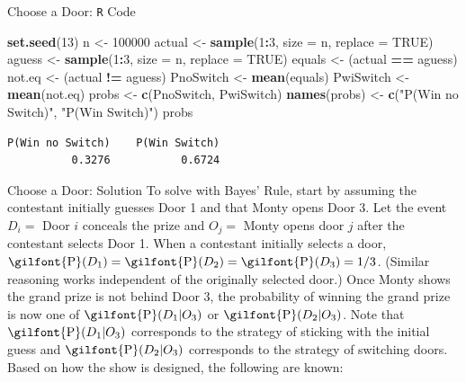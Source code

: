 \documentclass[
  ignorenonframetext,
]{beamer}
\newenvironment{Shaded}{\begin{snugshade}}{\end{snugshade}}
\newcommand{\AttributeTok}[1]{\textcolor[rgb]{0.13,0.29,0.53}{#1}}
\newcommand{\ConstantTok}[1]{\textcolor[rgb]{0.56,0.35,0.01}{#1}}
\newcommand{\DecValTok}[1]{\textcolor[rgb]{0.00,0.00,0.81}{#1}}
\newcommand{\FunctionTok}[1]{\textcolor[rgb]{0.13,0.29,0.53}{\textbf{#1}}}
\newcommand{\NormalTok}[1]{#1}
\newcommand{\OtherTok}[1]{\textcolor[rgb]{0.56,0.35,0.01}{#1}}
\newcommand{\SpecialCharTok}[1]{\textcolor[rgb]{0.81,0.36,0.00}{\textbf{#1}}}
\newcommand{\StringTok}[1]{\textcolor[rgb]{0.31,0.60,0.02}{#1}}
\begin{document}
\begin{frame}[fragile]{Choose a Door: \texttt{R} Code}
\protect\hypertarget{choose-a-door-r-code}{}
\small

\begin{Shaded}
\begin{Highlighting}[]
\FunctionTok{set.seed}\NormalTok{(}\DecValTok{13}\NormalTok{)}
\NormalTok{n }\OtherTok{\textless{}{-}} \DecValTok{100000}
\NormalTok{actual }\OtherTok{\textless{}{-}} \FunctionTok{sample}\NormalTok{(}\DecValTok{1}\SpecialCharTok{:}\DecValTok{3}\NormalTok{, }\AttributeTok{size =}\NormalTok{ n, }\AttributeTok{replace =} \ConstantTok{TRUE}\NormalTok{)}
\NormalTok{aguess }\OtherTok{\textless{}{-}} \FunctionTok{sample}\NormalTok{(}\DecValTok{1}\SpecialCharTok{:}\DecValTok{3}\NormalTok{, }\AttributeTok{size =}\NormalTok{ n, }\AttributeTok{replace =} \ConstantTok{TRUE}\NormalTok{)}
\NormalTok{equals }\OtherTok{\textless{}{-}}\NormalTok{ (actual }\SpecialCharTok{==}\NormalTok{ aguess)}
\NormalTok{not.eq }\OtherTok{\textless{}{-}}\NormalTok{ (actual }\SpecialCharTok{!=}\NormalTok{ aguess)}
\NormalTok{PnoSwitch }\OtherTok{\textless{}{-}} \FunctionTok{mean}\NormalTok{(equals)}
\NormalTok{PwiSwitch }\OtherTok{\textless{}{-}} \FunctionTok{mean}\NormalTok{(not.eq)}
\NormalTok{probs }\OtherTok{\textless{}{-}} \FunctionTok{c}\NormalTok{(PnoSwitch, PwiSwitch)}
\FunctionTok{names}\NormalTok{(probs) }\OtherTok{\textless{}{-}} \FunctionTok{c}\NormalTok{(}\StringTok{"P(Win no Switch)"}\NormalTok{, }\StringTok{"P(Win Switch)"}\NormalTok{)}
\NormalTok{probs}
\end{Highlighting}
\end{Shaded}

\begin{verbatim}
P(Win no Switch)    P(Win Switch) 
          0.3276           0.6724 
\end{verbatim}

\normalsize
\end{frame}

\begin{frame}{Choose a Door: Solution}
\protect\hypertarget{choose-a-door-solution}{}
To solve with Bayes' Rule, start by assuming the contestant initially
guesses Door 1 and that Monty opens Door 3. Let the event \(D_i=\) Door
\(i\) conceals the prize and \(O_j=\) Monty opens door \(j\) after the
contestant selects Door 1. When a contestant initially selects a door,
\(\textrm{\gilfont{P}}\normalfont (D_1)=\textrm{\gilfont{P}}\normalfont (D_2)=\textrm{\gilfont{P}}\normalfont (D_3)=1/3\).
(Similar reasoning works independent of the originally selected door.)
Once Monty shows the grand prize is not behind Door 3, the probability
of winning the grand prize is now one of
\(\textrm{\gilfont{P}}\normalfont (D_1|O_3)\) or
\(\textrm{\gilfont{P}}\normalfont (D_2|O_3)\). Note that
\(\textrm{\gilfont{P}}\normalfont (D_1|O_3)\) corresponds to the
strategy of sticking with the initial guess and
\(\textrm{\gilfont{P}}\normalfont (D_2|O_3)\) corresponds to the
strategy of switching doors. Based on how the show is designed, the
following are known:
\end{frame}
\end{document}
